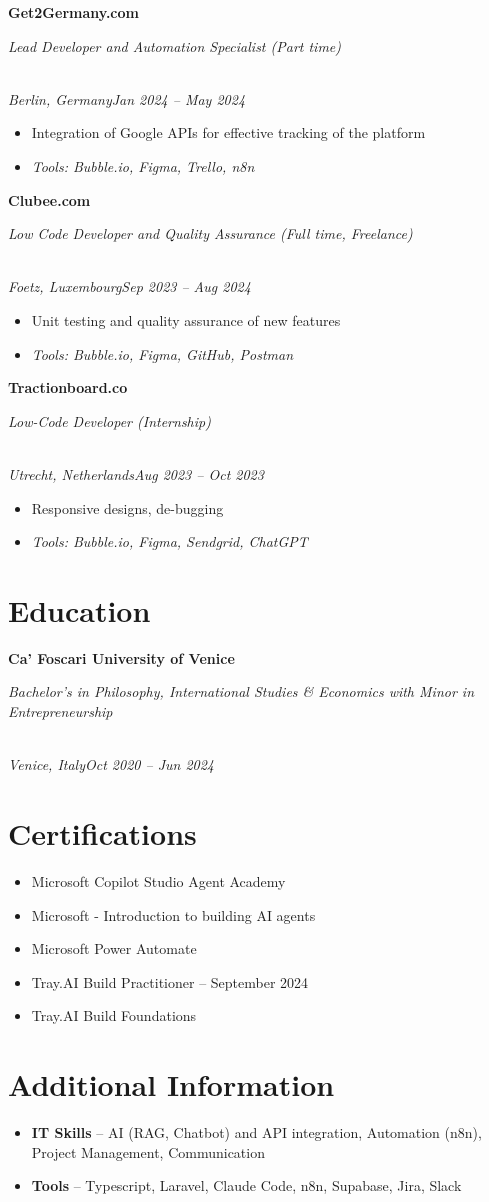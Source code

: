 \documentclass[a4paper,10pt]{article}
\newcommand{\role}[4]{\vspace{3pt}\noindent\hspace{0.6em}\parbox[t]{0.38\textwidth}{\raggedright\textbf{#1}}\hfill\parbox[t]{0.58\textwidth}{\raggedleft\textit{#2}}\\{\textit{#3}\hfill\textit{#4}}\vspace{1pt}}
\begin{document}
\role{Get2Germany.com}{Lead Developer and Automation Specialist (Part time)}{Berlin, Germany}{Jan 2024 -- May 2024}
\begin{itemize}
\item Integration of Google APIs for effective tracking of the platform
\item \textit{Tools: Bubble.io, Figma, Trello, n8n}
\end{itemize}

\role{Clubee.com}{Low Code Developer and Quality Assurance (Full time, Freelance)}{Foetz, Luxembourg}{Sep 2023 -- Aug 2024}
\begin{itemize}
\item Unit testing and quality assurance of new features
\item \textit{Tools: Bubble.io, Figma, GitHub, Postman}
\end{itemize}

\role{Tractionboard.co}{Low-Code Developer (Internship)}{Utrecht, Netherlands}{Aug 2023 -- Oct 2023}
\begin{itemize}
\item Responsive designs, de-bugging
\item \textit{Tools: Bubble.io, Figma, Sendgrid, ChatGPT}
\end{itemize}

\section{Education}
\role{Ca' Foscari University of Venice}{Bachelor's in Philosophy, International Studies \& Economics with Minor in Entrepreneurship}{Venice, Italy}{Oct 2020 -- Jun 2024}

\section{Certifications}
\begin{itemize}
\item Microsoft Copilot Studio Agent Academy
\item Microsoft - Introduction to building AI agents
\item Microsoft Power Automate
\item Tray.AI Build Practitioner -- September 2024
\item Tray.AI Build Foundations
\end{itemize}

\section{Additional Information}
\begin{itemize}
\item \textbf{IT Skills} -- AI (RAG, Chatbot) and API integration, Automation (n8n), Project Management, Communication
\item \textbf{Tools} -- Typescript, Laravel, Claude Code, n8n, Supabase, Jira, Slack
\end{itemize}
\end{document}
